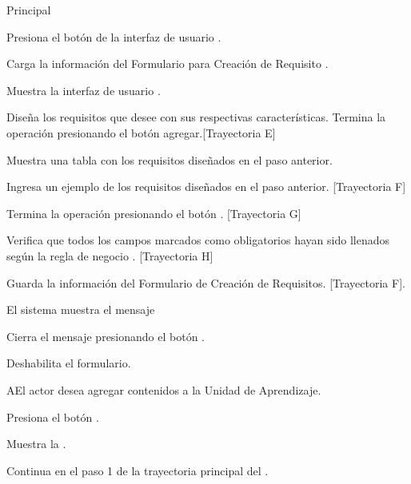 \begin{UCtrayectoria}{Principal}

\UCpaso[\UCactor] Presiona el botón  de la interfaz de usuario .

\UCpaso Carga la información del Formulario para Creación de Requisito .

\UCpaso Muestra la interfaz de usuario .

\UCpaso[\UCactor] Diseña los requisitos que desee con sus respectivas características.
\UCpaso[\UCactor] Termina la operación presionando el botón agregar.[Trayectoria E]

\UCpaso Muestra una tabla con los requisitos diseñados en el paso anterior.

\UCpaso[\UCactor] Ingresa un ejemplo de los requisitos diseñados en el paso anterior. [Trayectoria F]

\UCpaso[\UCactor] Termina la operación presionando el botón . [Trayectoria G]

\UCpaso Verifica que todos los campos marcados como obligatorios hayan sido llenados según la regla de negocio . [Trayectoria H]

\UCpaso Guarda la información del Formulario de Creación de Requisitos. [Trayectoria F].

\UCpaso El sistema muestra el mensaje 

\UCpaso[\UCactor] Cierra el mensaje presionando el botón .

\UCpaso Deshabilita el formulario. 

\end{UCtrayectoria}


\begin{UCtrayectoriaA}{A}{El actor desea agregar contenidos a la Unidad de Aprendizaje.}

\UCpaso[\UCactor] Presiona el botón .

\UCpaso Muestra la .

\UCpaso Continua en el paso 1 de la trayectoria principal del .
\end{UCtrayectoriaA}

